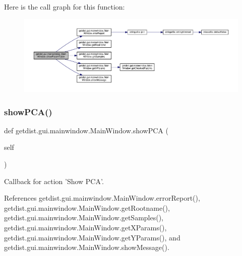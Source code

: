 Here is the call graph for this function\+:
\nopagebreak
\begin{figure}[H]
\begin{center}
\leavevmode
\includegraphics[width=350pt]{classgetdist_1_1gui_1_1mainwindow_1_1MainWindow_add82606cde0404943c1e1030451e586c_cgraph}
\end{center}
\end{figure}
\mbox{\label{classgetdist_1_1gui_1_1mainwindow_1_1MainWindow_a2ce9349444008527443bc8891a5b8a44}} 
\subsubsection{\texorpdfstring{show\+P\+C\+A()}{showPCA()}}
{\footnotesize\ttfamily def getdist.\+gui.\+mainwindow.\+Main\+Window.\+show\+P\+CA (\begin{DoxyParamCaption}\item[{}]{self }\end{DoxyParamCaption})}

\begin{DoxyVerb}Callback for action 'Show PCA'.
\end{DoxyVerb}
 

References getdist.\+gui.\+mainwindow.\+Main\+Window.\+error\+Report(), getdist.\+gui.\+mainwindow.\+Main\+Window.\+get\+Rootname(), getdist.\+gui.\+mainwindow.\+Main\+Window.\+get\+Samples(), getdist.\+gui.\+mainwindow.\+Main\+Window.\+get\+X\+Params(), getdist.\+gui.\+mainwindow.\+Main\+Window.\+get\+Y\+Params(), and getdist.\+gui.\+mainwindow.\+Main\+Window.\+show\+Message().

